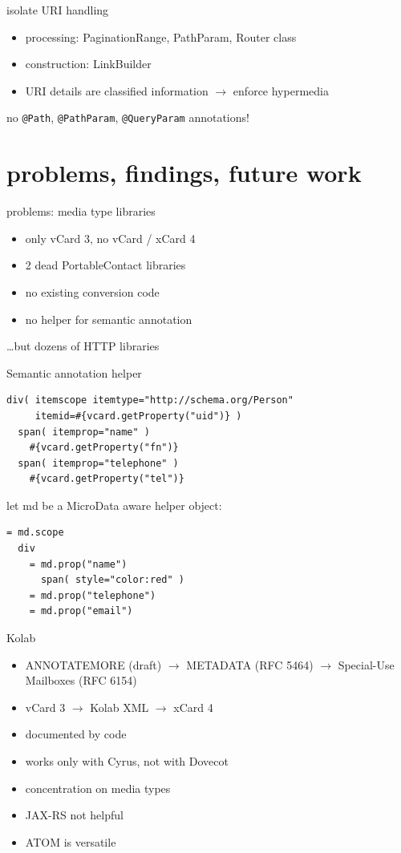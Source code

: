 \documentclass{beamer}
\begin{document}
\begin{frame}{isolate URI handling}
  \begin{itemize}
  \item processing: PaginationRange, PathParam, Router class
  \item construction: LinkBuilder
  \item URI details are classified information $\rightarrow$ enforce hypermedia
  \end{itemize}
  no \lstinline:@Path:, \lstinline:@PathParam:, \lstinline:@QueryParam: annotations!
\end{frame}

\section{problems, findings, future work}

\begin{frame}{problems: media type libraries}
  \begin{itemize}
    \item only vCard 3, no vCard / xCard 4
    \item 2 dead PortableContact libraries
    \item no existing conversion code
    \item no helper for semantic annotation
  \end{itemize}
  \pause
  \ldots but dozens of HTTP libraries
\end{frame}

\begin{frame}[fragile]{Semantic annotation helper}
  \begin{lstlisting}
div( itemscope itemtype="http://schema.org/Person"
     itemid=#{vcard.getProperty("uid")} )
  span( itemprop="name" )
    #{vcard.getProperty("fn")}
  span( itemprop="telephone" )
    #{vcard.getProperty("tel")}
  \end{lstlisting}
let md be a MicroData aware helper object:
  \begin{lstlisting}
= md.scope
  div
    = md.prop("name")
      span( style="color:red" )
    = md.prop("telephone")
    = md.prop("email")
  \end{lstlisting}
\end{frame}

\begin{frame}{Kolab}
  \begin{itemize}
  \item ANNOTATEMORE (draft) $\rightarrow$ METADATA (RFC 5464) $\rightarrow$ Special-Use Mailboxes (RFC 6154)
  \item vCard 3 $\rightarrow$ Kolab XML $\rightarrow$ xCard 4
  \item documented by code
  \item works only with Cyrus, not with Dovecot
  \end{itemize}
\end{frame}

\begin{frame}
  \begin{itemize}
  \item concentration on media types
  \item JAX-RS not helpful
  \item ATOM is versatile
  \end{itemize}
\end{frame}
\end{document}
